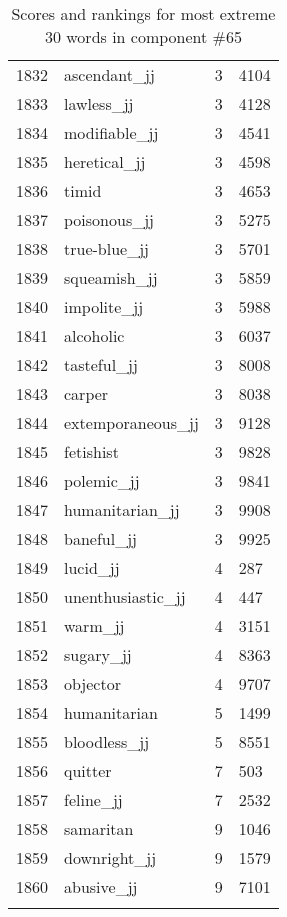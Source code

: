 \begin{longtable}[!htbp]{| rlr@{.}l |}
    1832 & ascendant\_jj & 3 & 4104 \\
    1833 & lawless\_jj & 3 & 4128 \\
    1834 & modifiable\_jj & 3 & 4541 \\
    1835 & heretical\_jj & 3 & 4598 \\
    1836 & timid & 3 & 4653 \\
    1837 & poisonous\_jj & 3 & 5275 \\
    1838 & true-blue\_jj & 3 & 5701 \\
    1839 & squeamish\_jj & 3 & 5859 \\
    1840 & impolite\_jj & 3 & 5988 \\
    1841 & alcoholic & 3 & 6037 \\
    1842 & tasteful\_jj & 3 & 8008 \\
    1843 & carper & 3 & 8038 \\
    1844 & extemporaneous\_jj & 3 & 9128 \\
    1845 & fetishist & 3 & 9828 \\
    1846 & polemic\_jj & 3 & 9841 \\
    1847 & humanitarian\_jj & 3 & 9908 \\
    1848 & baneful\_jj & 3 & 9925 \\
    1849 & lucid\_jj & 4 & 287 \\
    1850 & unenthusiastic\_jj & 4 & 447 \\
    1851 & warm\_jj & 4 & 3151 \\
    1852 & sugary\_jj & 4 & 8363 \\
    1853 & objector & 4 & 9707 \\
    1854 & humanitarian & 5 & 1499 \\
    1855 & bloodless\_jj & 5 & 8551 \\
    1856 & quitter & 7 & 503 \\
    1857 & feline\_jj & 7 & 2532 \\
    1858 & samaritan & 9 & 1046 \\
    1859 & downright\_jj & 9 & 1579 \\
    1860 & abusive\_jj & 9 & 7101 \\
    \hline
    \caption{Scores and rankings for most extreme 30 words in component \#65} \\
\end{longtable}
